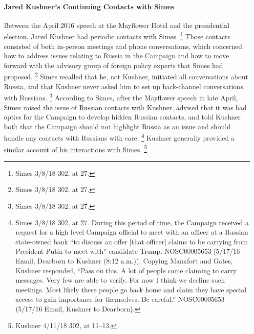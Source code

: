 \paragraph{Jared Kushner's Continuing Contacts with Simes}

Between the April 2016 speech at the Mayflower Hotel and the presidential election, Jared Kushner had periodic contacts with Simes.%
\footnote{Simes 3/8/18 302, at 27.}
Those contacts consisted of both in-person meetings and phone conversations, which concerned how to address issues relating to Russia in the Campaign and how to move forward with the advisory group of foreign policy experts that Simes had proposed.%
\footnote{Simes 3/8/18 302, at 27.}
Simes recalled that he, not Kushner, initiated all conversations about Russia, and that Kushner never asked him to set up back-channel conversations with Russians.%
\footnote{Simes 3/8/18 302, at 27.}
According to Simes, after the Mayflower speech in late April, Simes raised the issue of Russian contacts with Kushner, advised that it was bad optics for the Campaign to develop hidden Russian contacts, and told Kushner both that the Campaign should not highlight Russia as an issue and should handle any contacts with Russians with care.%
\footnote{Simes 3/8/18 302, at 27.
During this period of time, the Campaign received a request for a high level Campaign official to meet with an officer at a Russian state-owned bank “to discuss an offer [that officer] claims to be carrying from President Putin to meet with” candidate Trump.
NOSC00005653 (5/17/16 Email, Dearborn to Kushner (8:12 a.m.)).
Copying Manafort and Gates, Kushner responded, “Pass on this.
A lot of people come claiming to carry messages.
Very few are able to verify.
For now I think we decline such meetings.
Most likely these people go back home and claim they have special access to gain importance for themselves.
Be careful.”
NOSC00005653 (5/17/16 Email, Kushner to Dearborn).}
Kushner generally provided a similar account of his interactions with Simes.%
\footnote{Kushner 4/11/18 302, at 11--13.}

